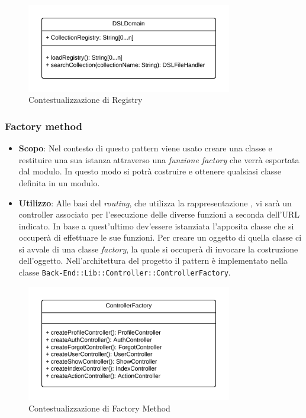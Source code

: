 \begin{figure}[H]
\centering \includegraphics[width=0.8\textwidth]{patterns/contestualizzazione/registry.png}
\caption{Contestualizzazione di Registry}
\label{fig:mvc}
\end{figure}

\subsubsection{Factory method}

\begin{itemize}

	\item \textbf{Scopo}: Nel contesto di  questo pattern viene usato creare una classe e restituire una sua istanza attraverso una \textit{funzione factory} che verrà esportata dal modulo. In questo modo si potrà costruire e ottenere qualsiasi classe definita in un modulo.
	\item \textbf{Utilizzo}: Alle basi del \textit{routing}, che utilizza la rappresentazione , vi sarà un controller associato per l'esecuzione delle diverse funzioni a seconda dell'URL indicato. In base a quest'ultimo dev'essere istanziata l'apposita classe che si occuperà di effettuare le sue funzioni. Per creare un oggetto di quella classe ci si avvale di una classe \textit{factory}, la quale si occuperà di invocare la costruzione dell'oggetto. Nell'architettura del progetto il pattern è implementato nella classe \texttt{Back-End::Lib::Controller::ControllerFactory}.

\end{itemize}

\begin{figure}[H]
\centering \includegraphics[width=0.8\textwidth]{patterns/contestualizzazione/factory-method.png}
\caption{Contestualizzazione di Factory Method}
\label{fig:mvc}
\end{figure}

